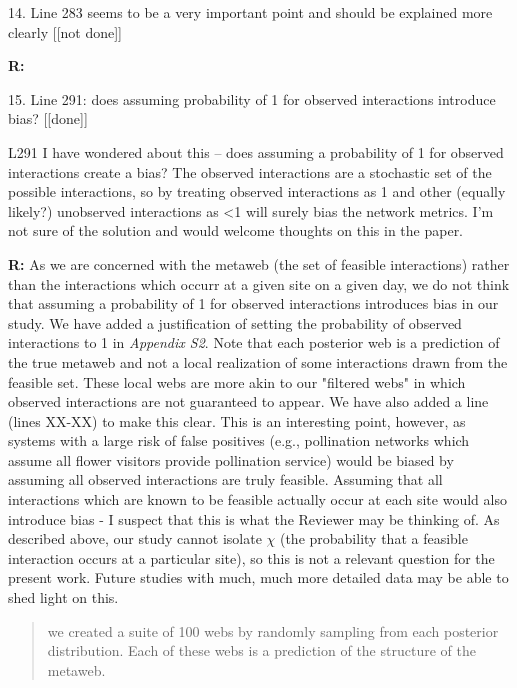 \documentclass[12pt]{letter}
\newenvironment{refquote}{\bigskip \begin{it}}{\end{it}\smallskip}
\begin{document}
	14. Line 283 seems to be a very important point and should be explained more clearly [[not done]]

		\textbf{R:}


	15. Line 291: does assuming probability of 1 for observed interactions introduce bias? [[done]]

		\begin{refquote}
		L291 I have wondered about this – does assuming a probability of 1 for observed interactions create a bias? The observed interactions are a stochastic set of the possible interactions, so by treating observed interactions as 1 and other (equally likely?) unobserved interactions as <1 will surely bias the network metrics. I’m not sure of the solution and would welcome thoughts on this in the paper.
		\end{refquote}

		\textbf{R:} As we are concerned with the metaweb (the set of feasible interactions) rather than the interactions which occurr at a given site on a given day, we do not think that assuming a probability of 1 for observed interactions introduces bias in our study. We have added a justification of setting the probability of observed interactions to 1 in \emph{Appendix S2}. Note that each posterior web is a prediction of the true metaweb and not a local realization of some interactions drawn from the feasible set. These local webs are more akin to our "filtered webs" in which observed interactions are not guaranteed to appear. We have also added a line (lines XX-XX) to make this clear.
		\medskip
		This is an interesting point, however, as systems with a large risk of false positives (e.g., pollination networks which assume all flower visitors provide pollination service) would be biased by assuming all observed interactions are truly feasible. Assuming that all interactions which are known to be feasible actually occur at each site would also introduce bias - I suspect that this is what the Reviewer may be thinking of. As described above, our study cannot isolate $\chi$ (the probability that a feasible interaction occurs at a particular site), so this is not a relevant question for the present work. Future studies with much, much more detailed data may be able to shed light on this.

		\begin{quotation}
			we created a suite of 100 webs by randomly sampling from each posterior distribution. Each of these webs is a prediction of the structure of the metaweb.
		\end{quotation}
\end{document}
